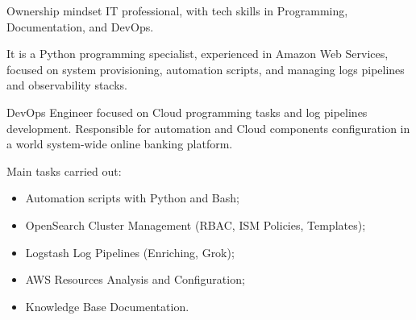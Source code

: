 \documentclass[10pt,a4paper]{altacv}
\begin{document}



\begin{fullwidth}
    \makecvheader
\end{fullwidth}



Ownership mindset IT professional, with tech skills in Programming, Documentation, and DevOps.

\bigskip

It is a Python programming specialist, experienced in Amazon Web Services, focused on system provisioning, automation scripts, and managing logs pipelines and observability stacks.



DevOps Engineer focused on Cloud programming tasks and log pipelines development. Responsible for automation and Cloud components configuration in a world system-wide online banking platform.

\bigskip

Main tasks carried out:

\bigskip

\begin{itemize}
    \item Automation scripts with Python and Bash;
    \item OpenSearch Cluster Management (RBAC, ISM Policies, Templates);
    \item Logstash Log Pipelines (Enriching, Grok);
    \item AWS Resources Analysis and Configuration;
    \item Knowledge Base Documentation.
\end{itemize}    

\divider
\end{document}
